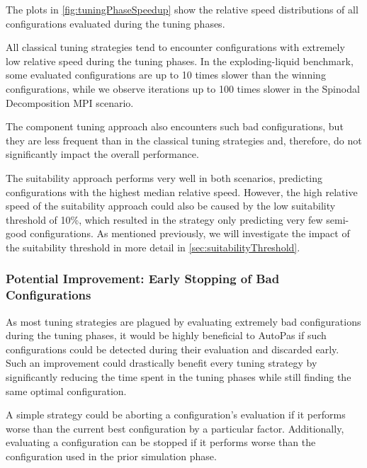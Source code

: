 The plots in \autoref{fig:tuningPhaseSpeedup} show the relative speed distributions of all configurations evaluated during the tuning phases.

All classical tuning strategies tend to encounter configurations with extremely low relative speed during the tuning phases. In the exploding-liquid benchmark, some evaluated configurations are up to 10 times slower than the winning configurations, while we observe iterations up to 100 times slower in the Spinodal Decomposition MPI scenario.

The component tuning approach also encounters such bad configurations, but they are less frequent than in the classical tuning strategies and, therefore, do not significantly impact the overall performance.

The suitability approach performs very well in both scenarios, predicting configurations with the highest median relative speed. However, the high relative speed of the suitability approach could also be caused by the low suitability threshold of 10\%, which resulted in the strategy only predicting very few semi-good configurations. As mentioned previously, we will investigate the impact of the suitability threshold in more detail in \autoref{sec:suitabilityThreshold}.

\subsubsection{Potential Improvement: Early Stopping of Bad Configurations}
\label{sec:earlyStopping}

As most tuning strategies are plagued by evaluating extremely bad configurations during the tuning phases, it would be highly beneficial to AutoPas if such configurations could be detected during their evaluation and discarded early. Such an improvement could drastically benefit every tuning strategy by significantly reducing the time spent in the tuning phases while still finding the same optimal configuration.

A simple strategy could be aborting a configuration's evaluation if it performs worse than the current best configuration by a particular factor. Additionally, evaluating a configuration can be stopped if it performs worse than the configuration used in the prior simulation phase.

